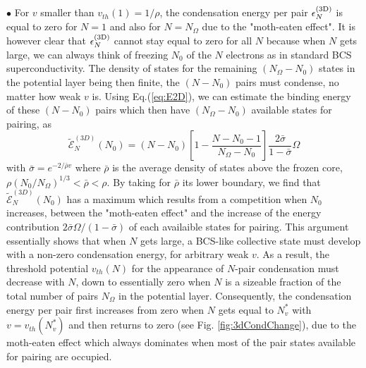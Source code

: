 \documentclass[5p,twocolumn]{elsarticle}
\begin{document}
$\bullet$ For $v$ smaller than $v_{th}(1)=1/\rho$, the condensation energy per pair $\epsilon_N^{{\text{(3D)}}}$ is equal to zero for $N=1$ and also for $N=N_\Omega$ due to the "moth-eaten effect".  It is however clear that $\epsilon_N^{{\text{(3D)}}}$ cannot stay equal to zero for all $N$ because when $N$ gets large, we can always think of freezing $N_0$ of the $N$ electrons as in standard BCS superconductivity. The density of states for the remaining $(N_\Omega - N_0)$ states in the potential layer being then finite, the $(N-N_0)$ pairs must condense, no matter how weak $v$ is.  Using Eq.(\ref{eq:E2D}),
 we can estimate the binding energy of these $(N-N_0)$ pairs which then have $(N_\Omega - N_0)$ available states for pairing, as
\begin{equation}\label{eq:E3D}
\widetilde{\mathcal{E}}_N^{(3D)}(N_0)=(N-N_0)\left[1-\frac{N-N_0-1}{N_\Omega-N_0}\right]\frac{2\bar\sigma}{1-\bar\sigma}\Omega
\end{equation}
with $\bar{\sigma}=e^{-2/{\bar{\rho}v}}$ where $\bar\rho$ is the average density of states above the frozen core, $\rho(N_0/N_\Omega)^{ 1/3}<\bar\rho<\rho$. By taking for  $\bar\rho$ its lower boundary, we find that $\widetilde{\mathcal{E}}_N^{(3D)}(N_0)$ has a maximum which results from a competition when $N_0$ increases, between the "moth-eaten effect" and the increase of the energy contribution $2\bar\sigma\Omega/(1-\bar\sigma)$ of each availaible states for pairing.
This argument essentially shows that when $N$ gets large, a BCS-like collective state must develop with a non-zero condensation energy, for arbitrary weak $v$. 
As a result, the threshold potential  $v_{th}(N)$ for the appearance of $N$-pair condensation  must decrease with $N$, down to essentially zero when $N$ is a sizeable fraction of the total number of pairs $N_\Omega$ in the potential layer.  Consequently, the condensation energy per pair first increases from zero when $N$ gets equal to $N_v^*$ with $v=v_{th}(N_v^*)$ and then returns to zero (see Fig. \ref{fig:3dCondChange}), due to the moth-eaten effect which always dominates when most of the pair states available for pairing are occupied. 


\end{document}

